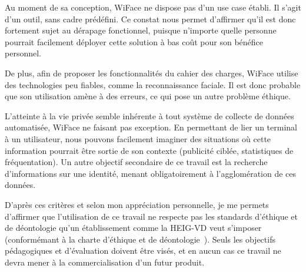 Au moment de sa conception, WiFace ne dispose pas d’un use case établi. Il s’agit d’un outil, sans cadre prédéfini.
Ce constat nous permet d’affirmer qu’il est donc fortement sujet au dérapage fonctionnel, puisque n’importe quelle
personne pourrait facilement déployer cette solution à bas coût pour son bénéfice personnel.

De plus, afin de proposer les fonctionnalités du cahier des charges, WiFace utilise des technologies peu fiables, comme la reconnaissance faciale. 
Il est donc probable que son utilisation amène à des erreurs, ce qui pose un autre
problème éthique.

L’atteinte à la vie privée semble inhérente à tout système de collecte de données automatisée, WiFace ne faisant
pas exception. En permettant de lier un terminal à un utilisateur, nous pouvons facilement imaginer des situations
où cette information pourrait être sortie de son contexte (publicité ciblée, statistiques de fréquentation). Un autre
objectif secondaire de ce travail est la recherche d’informations sur une identité, menant obligatoirement à
l’agglomération de ces données.

D’après ces critères et selon mon appréciation personnelle, je me permets d'affirmer que l’utilisation de ce travail ne respecte pas les standards d’éthique et de déontologie
qu’un établissement comme la HEIG-VD veut s’imposer (conformémant à la charte d'éthique et de déontologie~\cite{HESCHARTE}). Seuls les objectifs pédagogiques et d’évaluation doivent
être visés, et en aucun cas ce travail ne devra mener à la commercialisation d’un futur produit.

